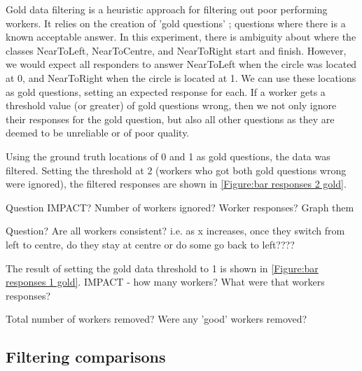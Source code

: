
Gold data filtering is a heuristic approach for filtering out poor performing workers. It relies on the creation of 'gold questions' ; questions where there is a known acceptable answer. In this experiment, there is ambiguity about where the classes NearToLeft, NearToCentre, and NearToRight start and finish. However, we would expect all responders to answer NearToLeft when the circle was located at 0, and NearToRight when the circle is located at 1. We can use these locations as gold questions, setting an expected response for each. If a worker gets a threshold value (or greater) of gold questions wrong, then we not only ignore their responses for the gold question, but also all other questions as they are deemed to be unreliable or of poor quality. 

Using the ground truth locations of 0 and 1 as gold questions, the data was filtered. Setting the threshold at 2 (workers who got both gold questions wrong were ignored), the filtered responses are shown in \ref{Figure:bar responses 2 gold}. 

Question IMPACT? Number of workers ignored? Worker responses? Graph them 

Question? Are all workers consistent? i.e. as x increases, once they switch from left to centre, do they stay at centre or do some go back to left???? 

The result of setting the gold data threshold to 1 is shown in \ref{Figure:bar responses 1 gold}. IMPACT - how many workers? What were that workers responses?

Total number of workers removed? Were any 'good' workers removed?


\subsection{Filtering comparisons}

